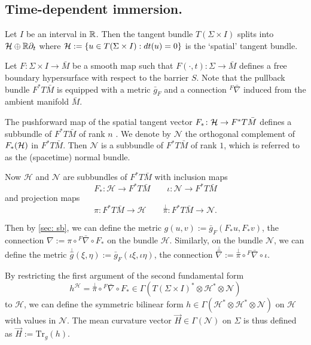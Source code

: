 \subsection{Time-dependent immersion.}
Let $I$ be an interval in $\mathbb{R}$. Then the tangent bundle $T(\Sigma \times I)$ splits into $\mathcal{H} \oplus \mathbb{R} \partial_t$ where $\mathcal{H} := \left\{ u \in T(\Sigma \times I) : dt(u)=0\right\} $  is the `spatial' tangent bundle.

Let $F\colon \Sigma \times I \to \bar{M}$ be a smooth map such that $F(\cdot,t) \colon \Sigma \to \bar{M} $ defines a free boundary hypersurface with respect to the barrier $S$. Note that the pullback bundle $F^*T\bar{M}$ is equipped with a metric $\bar{g}_F$ and a connection ${}^F \bar{\nabla }$ induced from the ambient manifold $\bar{M}$. 

The pushforward map of the spatial tangent vector $F_* \colon \mathcal{H} \to F^*T\bar{M} $ defines a subbundle of $F^*T\bar{M}$ of rank $n$ . We denote by $\mathcal{N} $ the orthogonal complement of $F_*(\mathcal{H})$ in $F^*T\bar{M}$. Then $\mathcal{N} $ is a subbundle of $F^*T\bar{M} $ of rank $1$, which is referred to as the (spacetime) normal bundle.

Now $\mathcal{H} $ and $\mathcal{N} $ are subbundles of $F^*T\bar{M} $ with inclusion maps
\[F_*\colon \mathcal{H} \to F^*T\bar{M} \qquad \iota \colon \mathcal{N} \to F^*T\bar{M} \]
and projection maps
\[\pi \colon F^*T\bar{M} \to \mathcal{H} \qquad \overset{\perp }{\pi} \colon F^*T\bar{M} \to \mathcal{N} .\]

Then by \autoref{sec: sb}, we can define the metric $g(u,v):=\bar{g}_F(F_* u, F_* v)$, the connection $\nabla := \pi \circ {}^F \bar{\nabla } \circ F_*$ on the bundle $\mathcal{H} $. Similarly, on the bundle $\mathcal{N} $, we can define the metric $\overset{\perp }{g} (\xi , \eta ):=\bar{g}_F(\iota \xi , \iota \eta )$, the connection $\overset{\perp }{\nabla} := \overset{\perp }{\pi} \circ {}^F \bar{\nabla } \circ \iota. $ 

By restricting the first argument of the second fundamental form \[h^{\mathcal{H} }=\overset{\perp }{\pi} \circ {}^F \bar{\nabla } \circ F_* \in \Gamma (T(\Sigma \times I)^* \otimes \mathcal{H} ^* \otimes \mathcal{N} )\] to $\mathcal{H} $, we can define the symmetric bilinear form $h \in \Gamma (\mathcal{H} ^* \otimes \mathcal{H} ^* \otimes \mathcal{N})$ on $\mathcal{H} $ with values in $\mathcal{N} $. The mean curvature vector $\vec{H} \in \Gamma (\mathcal{N} )$ on $\Sigma $ is thus defined as $\vec{H} := \mathrm{Tr}_g(h)$.

